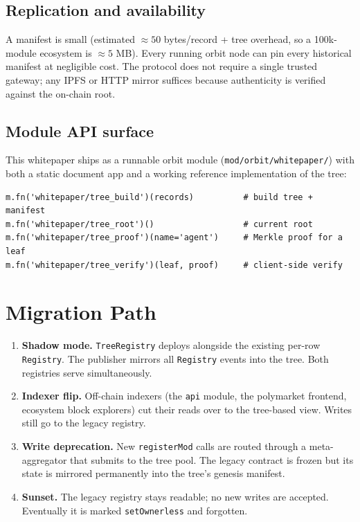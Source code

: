 \documentclass[11pt,a4paper]{article}
\begin{document}
\subsection{Replication and availability}

A manifest is small (estimated $\approx 50$ bytes/record + tree overhead, so a 100k-module ecosystem is $\approx 5$ MB). Every running orbit node can pin every historical manifest at negligible cost. The protocol does not require a single trusted gateway; any IPFS or HTTP mirror suffices because authenticity is verified against the on-chain root.

\subsection{Module API surface}

This whitepaper ships as a runnable orbit module (\texttt{mod/orbit/whitepaper/}) with both a static document app and a working reference implementation of the tree:

\begin{lstlisting}[style=python]
m.fn('whitepaper/tree_build')(records)          # build tree + manifest
m.fn('whitepaper/tree_root')()                  # current root
m.fn('whitepaper/tree_proof')(name='agent')     # Merkle proof for a leaf
m.fn('whitepaper/tree_verify')(leaf, proof)     # client-side verify
\end{lstlisting}

\section{Migration Path}

\begin{enumerate}
    \item \textbf{Shadow mode.} \texttt{TreeRegistry} deploys alongside the existing per-row \texttt{Registry}. The publisher mirrors all \texttt{Registry} events into the tree. Both registries serve simultaneously.
    \item \textbf{Indexer flip.} Off-chain indexers (the \texttt{api} module, the polymarket frontend, ecosystem block explorers) cut their reads over to the tree-based view. Writes still go to the legacy registry.
    \item \textbf{Write deprecation.} New \texttt{registerMod} calls are routed through a meta-aggregator that submits to the tree pool. The legacy contract is frozen but its state is mirrored permanently into the tree's genesis manifest.
    \item \textbf{Sunset.} The legacy registry stays readable; no new writes are accepted. Eventually it is marked \texttt{setOwnerless} and forgotten.
\end{enumerate}
\end{document}
